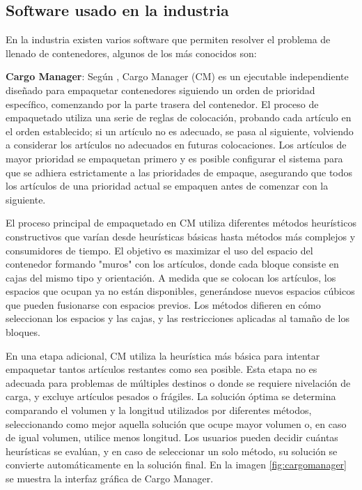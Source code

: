 \documentclass[openany]{article}
\begin{document}
\subsection{Software usado en la industria}

En la industria existen varios software que permiten resolver el problema de llenado de contenedores, algunos de los más conocidos son:

\textbf{Cargo Manager}: Según \textcite{zhao2017three}, Cargo Manager (CM) es un ejecutable independiente diseñado para empaquetar contenedores siguiendo un orden de prioridad específico, comenzando por la parte trasera del contenedor. El proceso de empaquetado utiliza una serie de reglas de colocación, probando cada artículo en el orden establecido; si un artículo no es adecuado, se pasa al siguiente, volviendo a considerar los artículos no adecuados en futuras colocaciones. Los artículos de mayor prioridad se empaquetan primero y es posible configurar el sistema para que se adhiera estrictamente a las prioridades de empaque, asegurando que todos los artículos de una prioridad actual se empaquen antes de comenzar con la siguiente.

El proceso principal de empaquetado en CM utiliza diferentes métodos heurísticos constructivos que varían desde heurísticas básicas hasta métodos más complejos y consumidores de tiempo. El objetivo es maximizar el uso del espacio del contenedor formando "muros" con los artículos, donde cada bloque consiste en cajas del mismo tipo y orientación. A medida que se colocan los artículos, los espacios que ocupan ya no están disponibles, generándose nuevos espacios cúbicos que pueden fusionarse con espacios previos. Los métodos difieren en cómo seleccionan los espacios y las cajas, y las restricciones aplicadas al tamaño de los bloques.

En una etapa adicional, CM utiliza la heurística más básica para intentar empaquetar tantos artículos restantes como sea posible. Esta etapa no es adecuada para problemas de múltiples destinos o donde se requiere nivelación de carga, y excluye artículos pesados o frágiles. La solución óptima se determina comparando el volumen y la longitud utilizados por diferentes métodos, seleccionando como mejor aquella solución que ocupe mayor volumen o, en caso de igual volumen, utilice menos longitud. Los usuarios pueden decidir cuántas heurísticas se evalúan, y en caso de seleccionar un solo método, su solución se convierte automáticamente en la solución final. En la imagen \ref{fig:cargomanager} se muestra la interfaz gráfica de Cargo Manager.
\end{document}
